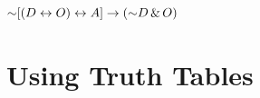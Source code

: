 \begin{earg}
%	


\item	$\mathord{\sim} [(D \leftrightarrow O) \leftrightarrow A] \rightarrow (\mathord{\sim} D \,\&\, O) $



\end{earg}



\section{Using Truth Tables}

